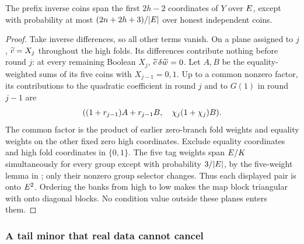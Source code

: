 \begin{lemma}\label{lem:jump-prefix}
The prefix inverse coins span the first $2h-2$ coordinates of $Y$ over $E$, except with probability at most $(2n+2h+3)/|E|$ over honest independent coins.
\end{lemma}
\begin{proof}
Take inverse differences, so all other terms vanish. On a plane assigned to $j$, $\widetilde{c}=X_j$ throughout the high folds. Its differences contribute nothing before round $j$: at every remaining Boolean $X_j$, $\widetilde{c}\,\delta\widetilde{w}=0$. Let $A,B$ be the equality-weighted sums of its five coins with $X_{j-1}=0,1$. Up to a common nonzero factor, its contributions to the quadratic coefficient in round $j$ and to $G(1)$ in round $j-1$ are
\[
 ((1+r_{j-1})A+r_{j-1}B,\quad \chi_j(1+\chi_j)B).
\]
The common factor is the product of earlier zero-branch fold weights and equality weights on the other fixed zero high coordinates. Exclude equality coordinates and high fold coordinates in $\{0,1\}$. The five tag weights span $E/K$ simultaneously for every group except with probability $3/|E|$, by the five-weight lemma in ; only their nonzero group selector changes. Thus each displayed pair is onto $E^2$. Ordering the banks from high to low makes the map block triangular with onto diagonal blocks. No condition value outside these planes enters them.
\end{proof}

\subsubsection{A tail minor that real data cannot cancel}

